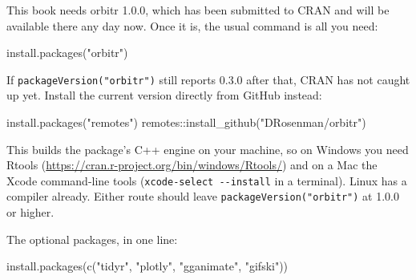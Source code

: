 \documentclass[
  10.5pt,
  letterpaper,
]{scrbook}
\newenvironment{Shaded}{\begin{snugshade}}{\end{snugshade}}
\newcommand{\FunctionTok}[1]{\textcolor[rgb]{0.00,0.00,0.00}{#1}}
\newcommand{\NormalTok}[1]{\textcolor[rgb]{0.00,0.00,0.00}{#1}}
\newcommand{\SpecialCharTok}[1]{\textcolor[rgb]{0.00,0.00,0.00}{#1}}
\newcommand{\StringTok}[1]{\textcolor[rgb]{0.00,0.00,0.00}{#1}}
\theoremstyle{definition}
\theoremstyle{plain}
\theoremstyle{remark}
\begin{document}
\begin{tcolorbox}[enhanced jigsaw, arc=.35mm, bottomrule=.15mm, bottomtitle=1mm, breakable, colback=white, colbacktitle=quarto-callout-note-color!10!white, colframe=quarto-callout-note-color-frame, coltitle=black, left=2mm, leftrule=.75mm, opacityback=0, opacitybacktitle=0.6, rightrule=.15mm, title={Installing version 1.0.0}, titlerule=0mm, toprule=.15mm, toptitle=1mm]

This book needs orbitr 1.0.0, which has been submitted to CRAN and will
be available there any day now. Once it is, the usual command is all you
need:

\begin{Shaded}
\begin{Highlighting}[]
\FunctionTok{install.packages}\NormalTok{(}\StringTok{"orbitr"}\NormalTok{)}
\end{Highlighting}
\end{Shaded}

If \texttt{packageVersion("orbitr")} still reports 0.3.0 after that,
CRAN has not caught up yet. Install the current version directly from
GitHub instead:

\begin{Shaded}
\begin{Highlighting}[]
\FunctionTok{install.packages}\NormalTok{(}\StringTok{"remotes"}\NormalTok{)}
\NormalTok{remotes}\SpecialCharTok{::}\FunctionTok{install\_github}\NormalTok{(}\StringTok{"DRosenman/orbitr"}\NormalTok{)}
\end{Highlighting}
\end{Shaded}

This builds the package's C++ engine on your machine, so on Windows you
need Rtools (\url{https://cran.r-project.org/bin/windows/Rtools/}) and
on a Mac the Xcode command-line tools
(\texttt{xcode-select\ -\/-install} in a terminal). Linux has a compiler
already. Either route should leave \texttt{packageVersion("orbitr")} at
1.0.0 or higher.

\end{tcolorbox}

The optional packages, in one line:

\begin{Shaded}
\begin{Highlighting}[]
\FunctionTok{install.packages}\NormalTok{(}\FunctionTok{c}\NormalTok{(}\StringTok{"tidyr"}\NormalTok{, }\StringTok{"plotly"}\NormalTok{, }\StringTok{"gganimate"}\NormalTok{, }\StringTok{"gifski"}\NormalTok{))}
\end{Highlighting}
\end{Shaded}
\end{document}
